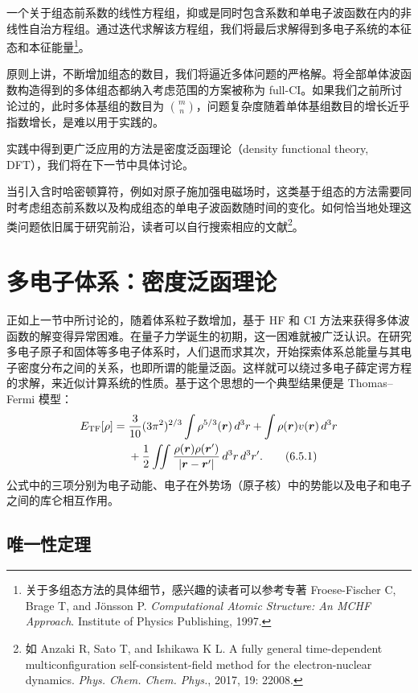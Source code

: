 一个关于组态前系数的线性方程组，抑或是同时包含系数和单电子波函数在内的非线性自治方程组。通过迭代求解该方程组，我们将最后求解得到多电子系统的本征态和本征能量\footnote{关于多组态方法的具体细节，感兴趣的读者可以参考专著 Froese-Fischer C, Brage T, and Jönsson P. \emph{Computational Atomic Structure: An MCHF Approach}. Institute of Physics Publishing, 1997.}。

原则上讲，不断增加组态的数目，我们将逼近多体问题的严格解。将全部单体波函数构造得到的多体组态都纳入考虑范围的方案被称为 full-CI。如果我们之前所讨论过的，此时多体基组的数目为 $\binom{m}{n}$，问题复杂度随着单体基组数目的增长近乎指数增长，是难以用于实践的。

实践中得到更广泛应用的方法是密度泛函理论（density functional theory, DFT），我们将在下一节中具体讨论。

当引入含时哈密顿算符，例如对原子施加强电磁场时，这类基于组态的方法需要同时考虑组态前系数以及构成组态的单电子波函数随时间的变化。如何恰当地处理这类问题依旧属于研究前沿，读者可以自行搜索相应的文献\footnote{如 Anzaki R, Sato T, and Ishikawa K L. A fully general time-dependent multiconfiguration self-consistent-field method for the electron-nuclear dynamics. \emph{Phys. Chem. Chem. Phys.}, 2017, 19: 22008.}。

\section{多电子体系：密度泛函理论}

正如上一节中所讨论的，随着体系粒子数增加，基于 HF 和 CI 方法来获得多体波函数的解变得异常困难。在量子力学诞生的初期，这一困难就被广泛认识。在研究多电子原子和固体等多电子体系时，人们退而求其次，开始探索体系总能量与其电子密度分布之间的关系，也即所谓的能量泛函。这样就可以绕过多电子薛定谔方程的求解，来近似计算系统的性质。基于这个思想的一个典型结果便是 Thomas--Fermi 模型：
\begin{align}
 E_{\mathrm{TF}}[\rho]={}&\frac3{10}(3\pi^2)^{2/3}\int\rho^{5/3}(\bm r)\,d^3r
 +\int\rho(\bm r)v(\bm r)\,d^3r\notag\\
 &+\frac12\iint\frac{\rho(\bm r)\rho(\bm r')}{|\bm r-\bm r'|}\,d^3r\,d^3r'.
\tag{6.5.1}
\end{align}
公式中的三项分别为电子动能、电子在外势场（原子核）中的势能以及电子和电子之间的库仑相互作用。

\subsection{唯一性定理}

